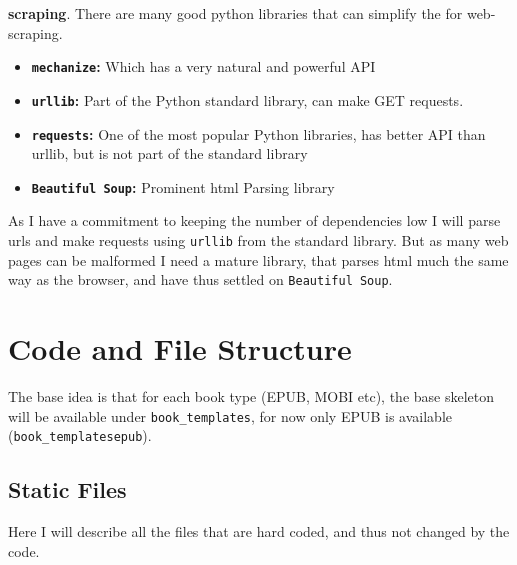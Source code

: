 \documentclass[]{report}   %
\begin{document}
\textbf{scraping}. There are many good python libraries that can simplify the for web-scraping.
\begin{itemize}
    \item \textbf{\texttt{mechanize}:} Which has a very natural and powerful API
    \item \textbf{\texttt{urllib}:} Part of the Python standard library, can make GET requests.
    \item \textbf{\texttt{requests}:} One of the most popular Python libraries,
        has better API than urllib, but is not part of the standard library
    \item \textbf{\texttt{Beautiful Soup}:} Prominent html Parsing library
\end{itemize}
As I have a commitment to keeping the number of dependencies low I will parse
urls and make requests using \texttt{urllib} from the standard library. But as
many web pages can be malformed I need a mature library, that parses html much
the same way as the browser, and have thus settled on \texttt{Beautiful Soup}.

\section{Code and File Structure}
The base idea is that for each book type (EPUB, MOBI etc), the base skeleton will be available
under \texttt{book\_templates}, for now only EPUB is available (\texttt{book\_templates\/epub\/}).

% 
% 
\subsection{Static Files}
Here I will describe all the files that are hard coded, and thus not changed by the code. 
\end{document}
